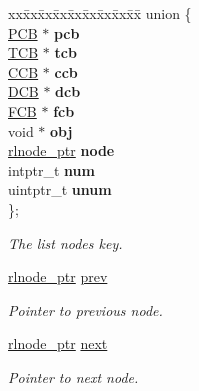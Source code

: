 \begin{DoxyCompactItemize}
\item 
\begin{tabbing}
xx\=xx\=xx\=xx\=xx\=xx\=xx\=xx\=xx\=\kill
union \{\\
\>\hyperlink{group__proc_gadf327f09ee935cf1734c14e8849f0421}{PCB} $\ast$ {\bfseries pcb}\\
\>\hyperlink{group__scheduler_gaf88d9c946bf70b36a1e8bc34383abfc9}{TCB} $\ast$ {\bfseries tcb}\\
\>\hyperlink{group__scheduler_ga7485b31e0dd9fd723bc2d75fba5206a0}{CCB} $\ast$ {\bfseries ccb}\\
\>\hyperlink{group__dev_gaf0e2d4a982667466d84f6fb7522611d6}{DCB} $\ast$ {\bfseries dcb}\\
\>\hyperlink{group__streams_ga0c7e751afb9d6cadebf070961804d400}{FCB} $\ast$ {\bfseries fcb}\\
\>void $\ast$ {\bfseries obj}\\
\>\hyperlink{group__rlists_gaae2ea9be18d20f0c80a62a2f8e2eed4d}{rlnode\_ptr} {\bfseries node}\\
\>intptr\_t {\bfseries num}\\
\>uintptr\_t {\bfseries unum}\\
\}; \\

\end{tabbing}\begin{DoxyCompactList}\small\item\em The list node\textquotesingle{}s key. \end{DoxyCompactList}\item 
\hyperlink{group__rlists_gaae2ea9be18d20f0c80a62a2f8e2eed4d}{rlnode\+\_\+ptr} \hyperlink{structresource__list__node_a280b77fdcee186bcaade02f76322d183}{prev}\hypertarget{structresource__list__node_a280b77fdcee186bcaade02f76322d183}{}\label{structresource__list__node_a280b77fdcee186bcaade02f76322d183}

\begin{DoxyCompactList}\small\item\em Pointer to previous node. \end{DoxyCompactList}\item 
\hyperlink{group__rlists_gaae2ea9be18d20f0c80a62a2f8e2eed4d}{rlnode\+\_\+ptr} \hyperlink{structresource__list__node_a04b1ee9524cd800f14de2925141e3762}{next}\hypertarget{structresource__list__node_a04b1ee9524cd800f14de2925141e3762}{}\label{structresource__list__node_a04b1ee9524cd800f14de2925141e3762}

\begin{DoxyCompactList}\small\item\em Pointer to next node. \end{DoxyCompactList}\end{DoxyCompactItemize}


